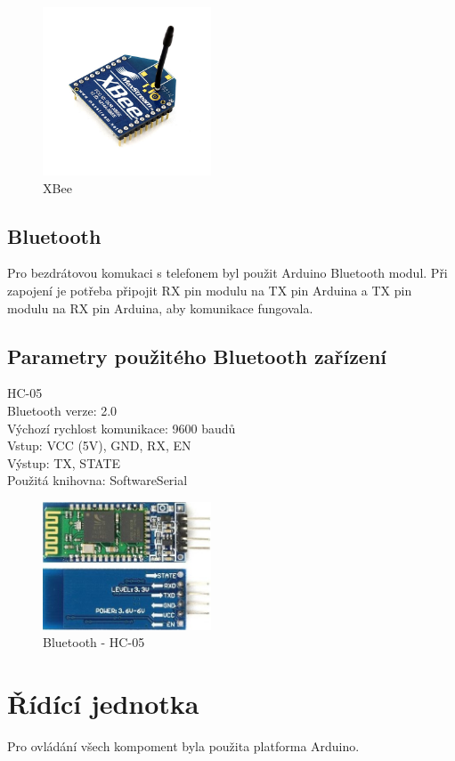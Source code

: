 \begin{figure}[h]
	\centering
	\includegraphics[width=5cm]{pictures/xbee.jpg}
	\caption{XBee}
\end{figure}

\subsection{Bluetooth} 
Pro bezdrátovou komukaci s telefonem byl použit Arduino Bluetooth modul. Při zapojení je potřeba připojit RX pin modulu na TX pin Arduina a TX pin modulu na RX pin Arduina, aby komunikace fungovala.

\subsection{Parametry použitého Bluetooth zařízení}
HC-05\\
Bluetooth verze: 2.0\\
Výchozí rychlost komunikace: 9600 baudů\\
Vstup: VCC (5V), GND, RX, EN\\
Výstup: TX, STATE\\
Použitá knihovna: SoftwareSerial\\

\begin{figure}[h]
	\centering
	\includegraphics[width=5cm]{pictures/blue.jpg}
	\caption{Bluetooth - HC-05}
\end{figure}

\section{Řídící jednotka} 
Pro ovládání všech kompoment byla použita platforma Arduino.

